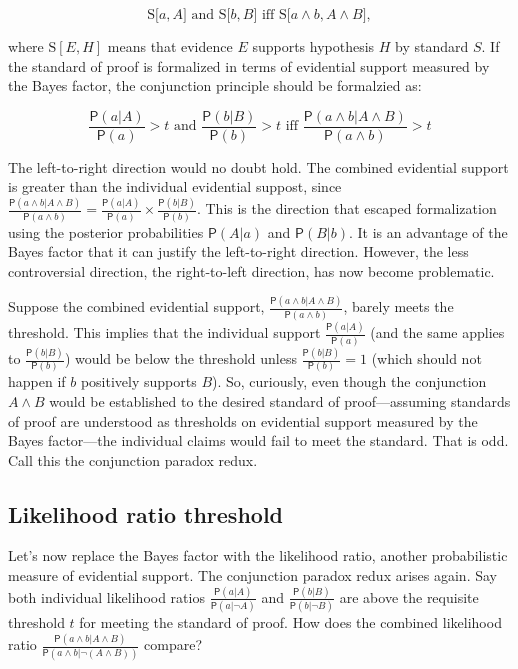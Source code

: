 \documentclass[10pt,dvipsnames,enabledeprecatedfontcommands]{scrartcl}
\newcommand{\et}{\wedge}
\newcommand{\pr}[1]{\mathsf{P}(#1)}
\begin{document}
\[\text{S[$a, A$] and S[$b, B$] iff S[$a \wedge b, A\wedge B$]},\]

\noindent
where \(\text{S}[E, H]\) means that evidence \(E\) supports hypothesis
\(H\) by standard \(S\). If the standard of proof is formalized in terms
of evidential support measured by the Bayes factor, the conjunction
principle should be formalzied as:

\[  \text{ $\frac{\pr{a | A }}{\pr{a}}>t$ and $\frac{\pr{ b | B}}{\pr{b}}>t$ iff $\frac{\pr{a \et b | A \et B}}{\pr{a \et b}}>t$ } \]

\noindent
The left-to-right direction would no doubt hold. The combined evidential
support is greater than the individual evidential suppost, since
\(\frac{\pr{a \et b | A \et B}}{\pr{a \et b}} = \frac{\pr{a |A}}{\pr{a}} \times \frac{\pr{b |B}}{\pr{b}}\).
This is the direction that escaped formalization using the posterior
probabilities \(\pr{A | a}\) and \(\pr{B | b}\). It is an advantage of
the Bayes factor that it can justify the left-to-right direction.
However, the less controversial direction, the right-to-left direction,
has now become problematic.

Suppose the combined evidential support,
\(\frac{\pr{a \et b | A \et B}}{\pr{a \et b}}\), barely meets the
threshold. This implies that the individual support
\(\frac{\pr{a |A}}{\pr{a}}\) (and the same applies to
\(\frac{\pr{b |B}}{\pr{b}}\)) would be below the threshold unless
\(\frac{\pr{b |B}}{\pr{b}}=1\)
(which should not happen if \(b\) positively supports \(B\)). So,
curiously, even though the conjunction \(A\et B\) would be established
to the desired standard of proof---assuming standards of proof are
understood as thresholds on evidential support measured by the Bayes
factor---the individual claims would fail to meet the standard. That is
odd. Call this the conjunction paradox redux.

\subsection{Likelihood ratio
threshold}\label{likelihood-ratio-threshold}

Let's now replace the Bayes factor with the likelihood ratio, another
probabilistic measure of evidential support. The conjunction paradox
redux arises again. Say both individual likelihood ratios
\(\frac{\pr{a |A}}{\pr{a | \neg A}}\) and
\(\frac{\pr{b |B}}{\pr{b | \neg B}}\) are above the requisite threshold
\(t\) for meeting the standard of proof. How does the combined
likelihood ratio
\(\frac{\pr{ a \et b |A \et B}}{\pr{a \et b | \neg (A \et B)}}\)
compare?
\end{document}
